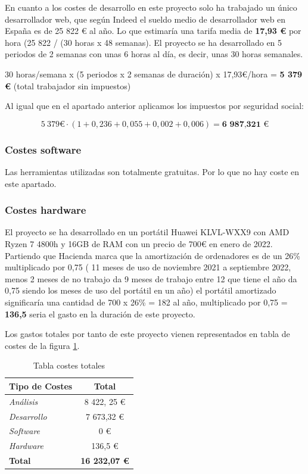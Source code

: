 En cuanto a los costes de desarrollo en este proyecto solo ha trabajado un único desarrollador web, que según Indeed \cite{indeed:oficial} el sueldo medio de desarrollador web en España es de 25 822 € al año. Lo que estimaría una tarifa media de \textbf{17,93 €} por hora (25 822 / (30 horas x 48 semanas). El proyecto se ha desarrollado en 5 periodos de 2 semanas con unas 6 horas al día, es decir, unas 30 horas semanales. 

30 horas/semana x (5 periodos x 2 semanas de duración) x 17,93€/hora = \textbf{5 379 €} (total trabajador sin impuestos)

Al igual que en el apartado anterior aplicamos los impuestos por seguridad social:

$$ 5\:379 \textbf{€} \cdot (1 + 0,236 + 0,055 + 0,002 + 0,006) = \textbf{6 987,321 €} $$


\subsubsection{Costes software}

Las herramientas utilizadas son totalmente gratuitas. Por lo que no hay coste en este apartado. 

\subsubsection{Costes hardware}

El proyecto se ha desarrollado en un portátil Huawei KLVL-WXX9 con AMD Ryzen 7 4800h y 16GB de RAM con un precio de 700€ en enero de 2022. Partiendo que Hacienda marca que la amortización de ordenadores es de un 26\% multiplicado por 0,75 ( 11 meses de uso de noviembre 2021 a septiembre 2022, menos 2 meses de no trabajo da 9 meses de trabajo entre 12 que tiene el año da 0,75 siendo los meses de uso del portátil en un año) el portátil amortizado significaría una cantidad de 700 x 26\% = 182 al año, multiplicado por 0,75 = \textbf{136,5} seria el gasto en la duración de este proyecto.

Los gastos totales por tanto de este proyecto vienen representados en tabla de costes de la figura \ref{fig:costes_totales}.

\begin{table}[h]
    \centering
    \begin{tabular}{l c}
         \textbf{Tipo de Costes} & \textbf{Total } \\ 
         \hline
         \textit{Análisis} & 8 422, 25 € \\ 
         \textit{Desarrollo} & 7 673,32 € \\  
         \textit{Software} & 0 € \\ 
         \textit{Hardware} & 136,5 €   \\ 
         \hline
         \textbf{Total} & \textbf{16 232,07 €}\\ 
    \end{tabular}
    \caption{Tabla costes totales}
    \label{fig:costes_totales}
\end{table}


